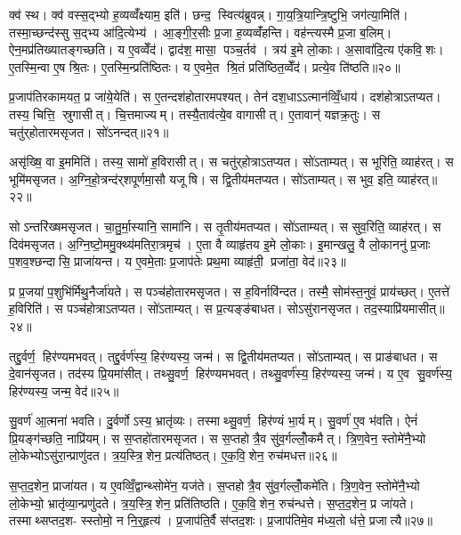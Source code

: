 क्व॑ स्थ। क्व॑ वस्स॒द्भ्यो ह॒व्यव्वँ॑क्ष्याम॒ इति॑। छन्द॒ स्वित्य॑ब्रुवन्न्। गा॒य॒त्रि॒यान्त्रि॒ष्टुभि॒ जग॑त्या॒मिति॑। तस्मा॒च्छन्द॑स्सु स॒द्भ्य आ॑दि॒त्येभ्य॑। आ॒ङ्गी॒र॒सीः प्र॒जा ह॒व्यव्वँ॑हन्ति। वह॑न्त्यस्मै प्र॒जा ब॒लिम्। ऐन॒मप्र॑तिख्यातङ्गच्छति। य ए॒वव्वेँद॑। द्वाद॑श॒ मासा॒ पञ्च॒र्तव॑। त्रय॑ इ॒मे लो॒काः। अ॒सावा॑दि॒त्य ए॑कवि॒शः। ए॒तस्मि॒न्वा ए॒ष श्रि॒तः। ए॒तस्मि॒न्प्रति॑ष्ठितः। य ए॒वमे॒त श्रि॒तं प्रति॑ष्ठित॒व्वेँद॑। प्रत्ये॒व ति॑ष्ठति॥२०॥\anuvakamend[स्या॒दिति॑ सव्वँथ्स॒रो ज॑नयध्व॒मितीत्य॑ब्रवी॒त्पूर्व॒ इत्या॑दि॒त्यानृ॒तव॒ष्षट्च॑]

प्र॒जाप॑तिरकामयत॒ प्र जा॑ये॒येति॑। स ए॒तन्दश॑होतारमपश्यत्। तेन॑ दश॒धाऽऽत्मान॑व्विँ॒धाय॑। दश॑होत्राऽतप्यत। तस्य॒ चित्ति॒ स्रुगासीत्। चि॒त्तमाज्यम्। तस्यै॒ताव॑त्ये॒व वागासीत्। ए॒तावान्॑ यज्ञक्र॒तुः। स चतु॑र्‌होतारमसृजत। सो॑ऽनन्दत्॥२१॥

असृ॑ख्षि॒ वा इ॒ममिति॑। तस्य॒ सामो॑ ह॒विरासीत्। स चतु॑र्‌होत्राऽतप्यत। सो॑ऽताम्यत्। स भूरिति॒ व्याह॑रत्। स भूमि॑मसृजत। अ॒ग्नि॒हो॒त्रन्द॑र्‌शपूर्णमा॒सौ यजूषि। स द्वि॒तीय॑मतप्यत। सो॑ऽताम्यत्। स भुव॒ इति॒ व्याह॑रत्॥२२॥

सोऽन्तरि॑ख्षमसृजत। चा॒तु॒र्मा॒स्यानि॒ सामा॑नि। स तृ॒तीय॑मतप्यत। सो॑ऽताम्यत्। स सुव॒रिति॒ व्याह॑रत्। स दिव॑मसृजत। अ॒ग्नि॒ष्टो॒ममु॒क्थ्य॑मतिरा॒त्रमृच॑। ए॒ता वै व्याहृ॑तय इ॒मे लो॒काः। इ॒मान्खलु॒ वै लो॒काननु॑ प्र॒जाः प॒शव॒श्छन्दासि॒ प्राजा॑यन्त। य ए॒वमे॒ताः प्र॒जाप॑तेः प्रथ॒मा व्याहृ॑ती॒ प्रजा॑ता॒ वेद॑॥२३॥

प्र प्र॒जया॑ प॒शुभि॑र्मिथु॒नैर्जा॑यते। स पञ्च॑होतारमसृजत। स ह॒विर्नावि॑न्दत। तस्मै॒ सोम॑स्त॒नुवं॒ प्राय॑च्छत्। ए॒तत्ते॑ ह॒विरिति॑। स पञ्च॑होत्राऽतप्यत। सो॑ऽताम्यत्। स प्र॒त्यङ्ङ॑बाधत। सोऽसु॑रानसृजत। तद॒स्याप्रि॑यमासीत्॥२४॥

तद्दु॒र्वर्ण॒ हिर॑ण्यमभवत्। तद्दु॒र्वर्ण॑स्य॒ हिर॑ण्यस्य॒ जन्म॑। स द्वि॒तीय॑मतप्यत। सो॑ऽताम्यत्। स प्राङ॑बाधत। स दे॒वान॑सृजत। तद॑स्य प्रि॒यमा॑सीत्। तथ्सु॒वर्ण॒ हिर॑ण्यमभवत्। तथ्सु॒वर्ण॑स्य॒ हिर॑ण्यस्य॒ जन्म॑। य ए॒व सु॒वर्ण॑स्य॒ हिर॑ण्यस्य॒ जन्म॒ वेद॑॥२५॥

सु॒वर्ण॑ आ॒त्मना॑ भवति। दु॒र्वर्णोऽस्य॒ भ्रातृ॑व्यः। तस्माथ्सु॒वर्ण॒ हिर॑ण्यं भा॒र्यम्। सु॒वर्ण॑ ए॒व भ॑वति। ऐनं॑ प्रि॒यङ्ग॑च्छति॒ नाप्रि॑यम्। स स॒प्तहो॑तारमसृजत। स स॒प्तहोत्रै॒व सु॑व॒र्गल्लोँ॒कमैत्। त्रि॒ण॒वेन॒ स्तोमे॑नै॒भ्यो लो॒केभ्योऽसु॑रा॒न्प्राणु॑दत। त्र॒य॒स्त्रि॒शेन॒ प्रत्य॑तिष्ठत्। ए॒क॒वि॒शेन॒ रुच॑मधत्त॥२६॥

स॒प्त॒द॒शेन॒ प्राजा॑यत। य ए॒वव्विँ॒द्वान्थ्सोमे॑न॒ यज॑ते। स॒प्तहोत्रै॒व सु॑व॒र्गल्लोँ॒कमे॑ति। त्रि॒ण॒वेन॒ स्तोमे॑नै॒भ्यो लो॒केभ्यो॒ भ्रातृ॑व्या॒न्प्रणु॑दते। त्र॒य॒स्त्रि॒शेन॒ प्रति॑तिष्ठति। ए॒क॒वि॒शेन॒ रुच॑न्धत्ते। स॒प्त॒द॒शेन॒ प्र जा॑यते। तस्माथ्सप्तद॒श- स्स्तोमो॒ न नि॒र्॒हृत्य॑। प्र॒जाप॑ति॒र्वै स॑प्तद॒शः। प्र॒जाप॑तिमे॒व म॑ध्य॒तो ध॑त्ते॒ प्रजात्यै॥२७॥\anuvakamend[अ॒न॒न्द॒द्भुव॒ इति॒ व्याह॑र॒द्वेदा॑सी॒द्वेदा॑धत्त॒ प्रजात्यै]

